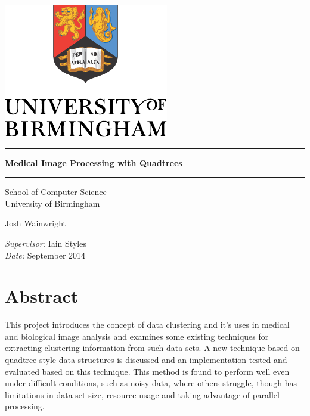 
\begin{titlepage}
	\begin{center}
		\vspace*{\fill}

		\centering
		\includegraphics[scale=1.0]{Logo.pdf}
		\vfill

		\hrule
		{\LARGE\bf Medical Image Processing with Quadtrees\\[0.4cm]}
		\hrule

		\vfill
		\large
		School of Computer Science\\
		University of Birmingham

		\vfill
		Josh Wainwright
		\vfill

		\vfill
		\textit{Supervisor:} Iain Styles \\
		\vfill
		\textit{Date:} September 2014
		\vfill
		\vfill

	\end{center}
\end{titlepage}
\restoregeometry%

{}
\thispagestyle{empty}


\part*{Abstract}
\label{prt:abstract}

This project introduces the concept of data clustering and it's uses in medical
and biological image analysis and examines some existing techniques for
extracting clustering information from such data sets. A new technique based on
quadtree style data structures is discussed and an implementation tested and
evaluated based on this technique. This method is found to perform well even
under difficult conditions, such as noisy data, where others struggle, though
has limitations in data set size, resource usage and taking advantage of
parallel processing.

